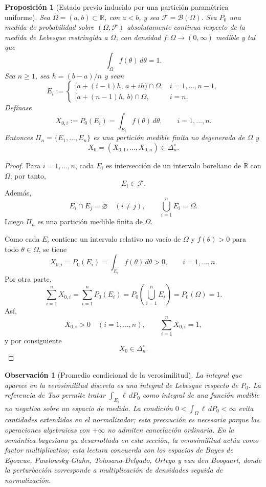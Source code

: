 \documentclass[12pt]{article}
\newtheorem{proposicion}{Proposición}[section]
\newtheorem{observacion}{Observación}[section]
\begin{document}
\begin{proposicion}[Estado previo inducido por una partición paramétrica uniforme]\label{prop:estado_parametrico_simplex}
Sea $\Omega=(a,b)\subset\mathbb R$, con $a<b$, y sea $\mathcal F=\mathcal B(\Omega)$. Sea $P_0$ una medida de probabilidad sobre $(\Omega,\mathcal F)$ absolutamente continua respecto de la medida de Lebesgue restringida a $\Omega$, con densidad $f:\Omega\to(0,\infty)$ medible y tal que
\[
\int_\Omega f(\theta)\,d\theta=1.
\]
Sea $n\ge 1$, sea $h=(b-a)/n$ y sean
\[
E_i:=
\begin{cases}
[a+(i-1)h,\,a+ih)\cap\Omega, & i=1,\dots,n-1,\\[4pt]
[a+(n-1)h,\,b)\cap\Omega, & i=n.
\end{cases}
\]
Defínase
\[
X_{0,i}:=P_0(E_i)=\int_{E_i}f(\theta)\,d\theta,
\qquad i=1,\dots,n.
\]
Entonces $\Pi_n=\{E_1,\dots,E_n\}$ es una partición medible finita no degenerada de $\Omega$ y
\[
X_0=(X_{0,1},\dots,X_{0,n})\in\Delta_n^\circ.
\]
\end{proposicion}

\begin{proof}
Para $i=1,\dots,n$, cada $E_i$ es intersección de un intervalo boreliano de $\mathbb R$ con $\Omega$; por tanto,
\[
E_i\in\mathcal F.
\]
Además,
\[
E_i\cap E_j=\varnothing\quad (i\ne j),
\qquad
\bigcup_{i=1}^n E_i=\Omega.
\]
Luego $\Pi_n$ es una partición medible finita de $\Omega$.

Como cada $E_i$ contiene un intervalo relativo no vacío de $\Omega$ y $f(\theta)>0$ para todo $\theta\in\Omega$, se tiene
\[
X_{0,i}
=P_0(E_i)
=\int_{E_i}f(\theta)\,d\theta
>0,
\qquad i=1,\dots,n.
\]
Por otra parte,
\[
\sum_{i=1}^n X_{0,i}
=
\sum_{i=1}^n P_0(E_i)
=
P_0\!\left(\bigcup_{i=1}^n E_i\right)
=
P_0(\Omega)
=1.
\]
Así,
\[
X_{0,i}>0\quad (i=1,\dots,n),
\qquad
\sum_{i=1}^nX_{0,i}=1,
\]
y por consiguiente
\[
X_0\in\Delta_n^\circ.
\]
\end{proof}

\begin{observacion}[Promedio condicional de la verosimilitud]
La integral que aparece en la verosimilitud discreta es una integral de Lebesgue respecto de $P_0$. La referencia de Tao permite tratar $\int_{E_i}\ell\,dP_0$ como integral de una función medible no negativa sobre un espacio de medida. La condición $0<\int_\Omega \ell\,dP_0<\infty$ evita cantidades extendidas en el normalizador; esta precaución es necesaria porque las operaciones algebraicas con $+\infty$ no admiten cancelación ordinaria. En la semántica bayesiana ya desarrollada en esta sección, la verosimilitud actúa como factor multiplicativo; esta lectura concuerda con los espacios de Bayes de Egozcue, Pawlowsky-Glahn, Tolosana-Delgado, Ortego y van den Boogaart, donde la perturbación corresponde a multiplicación de densidades seguida de normalización.
\end{observacion}
\end{document}
